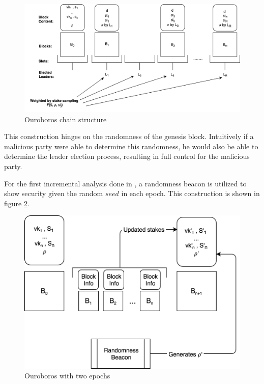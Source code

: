 \begin{figure}[H]
    \centering
    \includegraphics[width=\linewidth]{images/ouroboros-chain.png}
    \caption{Ouroboros chain structure}
    \label{fig:ouro-chain}
\end{figure}

This construction hinges on the randomness of the genesis block. Intuitively if a malicious party were able to determine this randomness, he would also be able to determine the leader election process, resulting in full control for the malicious party. 

For the first incremental analysis done in \cite{ouroboros}, a randomness beacon is utilized to show security given the random $seed$ in each epoch. This construction is shown in figure \ref{fig:ouro-epoch}.

\begin{figure}[H]
    \centering
    \includegraphics[width=\linewidth]{images/Ouroboros-epoch.png}
    \caption{Ouroboros with two epochs}
    \label{fig:ouro-epoch}
\end{figure}

